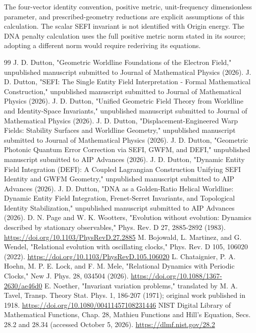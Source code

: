 \documentclass[aip,adv,preprint,floatfix]{revtex4-2}
\begin{document}
The four-vector identity convention, positive metric, unit-frequency dimensionless parameter, and prescribed-geometry reductions are explicit assumptions of this calculation. The scalar SEFI invariant is not identified with Origin energy. The DNA penalty calculation uses the full positive metric norm stated in its source; adopting a different norm would require rederiving its equations.

\begin{thebibliography}{99}
 J. D. Dutton, "Geometric Worldline Foundations of the Electron Field," unpublished manuscript submitted to Journal of Mathematical Physics (2026).
 J. D. Dutton, "SEFI: The Single Entity Field Interpretation - Formal Mathematical Construction," unpublished manuscript submitted to Journal of Mathematical Physics (2026).
 J. D. Dutton, "Unified Geometric Field Theory from Worldline and Identity-Space Invariants," unpublished manuscript submitted to Journal of Mathematical Physics (2026).
 J. D. Dutton, "Displacement-Engineered Warp Fields: Stability Surfaces and Worldline Geometry," unpublished manuscript submitted to Journal of Mathematical Physics (2026).
 J. D. Dutton, "Geometric Photonic Quantum Error Correction via SEFI, GWFM, and DEFI," unpublished manuscript submitted to AIP Advances (2026).
 J. D. Dutton, "Dynamic Entity Field Integration (DEFI): A Coupled Lagrangian Construction Unifying SEFI Identity and GWFM Geometry," unpublished manuscript submitted to AIP Advances (2026).
 J. D. Dutton, "DNA as a Golden-Ratio Helical Worldline: Dynamic Entity Field Integration, Frenet-Serret Invariants, and Topological Identity Stabilization," unpublished manuscript submitted to AIP Advances (2026).
 D. N. Page and W. K. Wootters, "Evolution without evolution: Dynamics described by stationary observables," Phys. Rev. D 27, 2885-2892 (1983). \url{https://doi.org/10.1103/PhysRevD.27.2885}
 M. Bojowald, L. Martinez, and G. Wendel, "Relational evolution with oscillating clocks," Phys. Rev. D 105, 106020 (2022). \url{https://doi.org/10.1103/PhysRevD.105.106020}
 L. Chataignier, P. A. Hoehn, M. P. E. Lock, and F. M. Mele, "Relational Dynamics with Periodic Clocks," New J. Phys. 28, 034504 (2026). \url{https://doi.org/10.1088/1367-2630/ae46d0}
 E. Noether, "Invariant variation problems," translated by M. A. Tavel, Transp. Theory Stat. Phys. 1, 186-207 (1971); original work published in 1918. \url{https://doi.org/10.1080/00411457108231446}
 NIST Digital Library of Mathematical Functions, Chap. 28, Mathieu Functions and Hill's Equation, Secs. 28.2 and 28.34 (accessed October 5, 2026). \url{https://dlmf.nist.gov/28.2}

\end{thebibliography}
\end{document}
